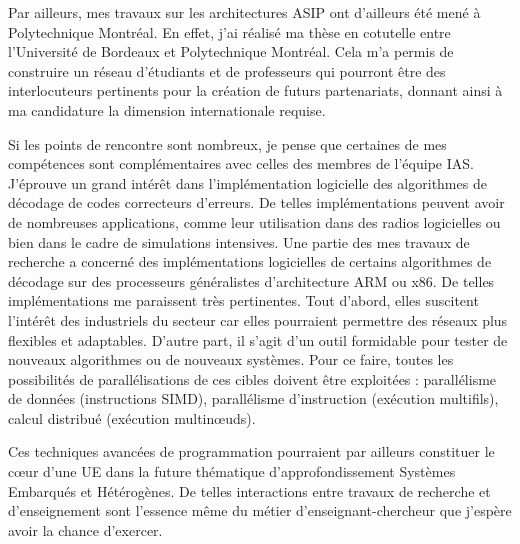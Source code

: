 Par ailleurs, mes travaux sur les architectures ASIP ont d'ailleurs été mené à Polytechnique Montréal. En effet, j'ai réalisé ma thèse en cotutelle entre l'Université de Bordeaux et Polytechnique Montréal. Cela m'a permis de construire un réseau d'étudiants et de professeurs qui pourront être des interlocuteurs pertinents pour la création de futurs partenariats, donnant ainsi à ma candidature la dimension internationale requise.

Si les points de rencontre sont nombreux, je pense que certaines de mes compétences sont complémentaires avec celles des membres de l'équipe IAS. J'éprouve un grand intérêt dans l'implémentation logicielle des algorithmes de décodage de codes correcteurs d'erreurs. De telles implémentations peuvent avoir de nombreuses applications, comme leur utilisation dans des radios logicielles ou bien dans le cadre de simulations intensives. Une partie des mes travaux de recherche a concerné des implémentations logicielles de certains algorithmes de décodage sur des processeurs généralistes d'architecture ARM ou x86. De telles implémentations me paraissent très pertinentes. Tout d'abord, elles suscitent l'intérêt des industriels du secteur car elles pourraient permettre des réseaux plus flexibles et adaptables. D'autre part, il s'agit d'un outil formidable pour tester de nouveaux algorithmes ou de nouveaux systèmes. Pour ce faire, toutes les possibilités de parallélisations de ces cibles doivent être exploitées : parallélisme de données (instructions SIMD), parallélisme d'instruction (exécution multifils), calcul distribué (exécution multin\oe{}uds).

Ces techniques avancées de programmation pourraient par ailleurs constituer le c\oe{}ur d'une UE dans la future thématique d'approfondissement Systèmes Embarqués et Hétérogènes. De telles interactions entre travaux de recherche et d'enseignement sont l'essence même du métier d'enseignant-chercheur que j'espère avoir la chance d'exercer.
\clearpage
